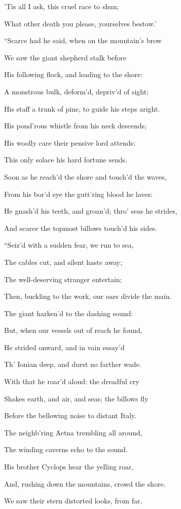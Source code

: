 ’Tis all I ask, this cruel race to shun;

What other death you please, yourselves bestow.’

“Scarce had he said, when on the mountain’s brow

We saw the giant shepherd stalk before

His following flock, and leading to the shore:

A monstrous bulk, deform’d, depriv’d of sight;

His staff a trunk of pine, to guide his steps aright.

His pond’rous whistle from his neck descends;

His woolly care their pensive lord attends:

This only solace his hard fortune sends.

Soon as he reach’d the shore and touch’d the waves,

From his bor’d eye the gutt’ring blood he laves:

He gnash’d his teeth, and groan’d; thro’ seas he strides,

And scarce the topmost billows touch’d his sides.

“Seiz’d with a sudden fear, we run to sea,

The cables cut, and silent haste away;

The well-deserving stranger entertain;

Then, buckling to the work, our oars divide the main.

The giant harken’d to the dashing sound:

But, when our vessels out of reach he found,

He strided onward, and in vain essay’d

Th’ Ionian deep, and durst no farther wade.

With that he roar’d aloud: the dreadful cry

Shakes earth, and air, and seas; the billows fly

Before the bellowing noise to distant Italy.

The neighb’ring Aetna trembling all around,

The winding caverns echo to the sound.

His brother Cyclops hear the yelling roar,

And, rushing down the mountains, crowd the shore.

We saw their stern distorted looks, from far,

